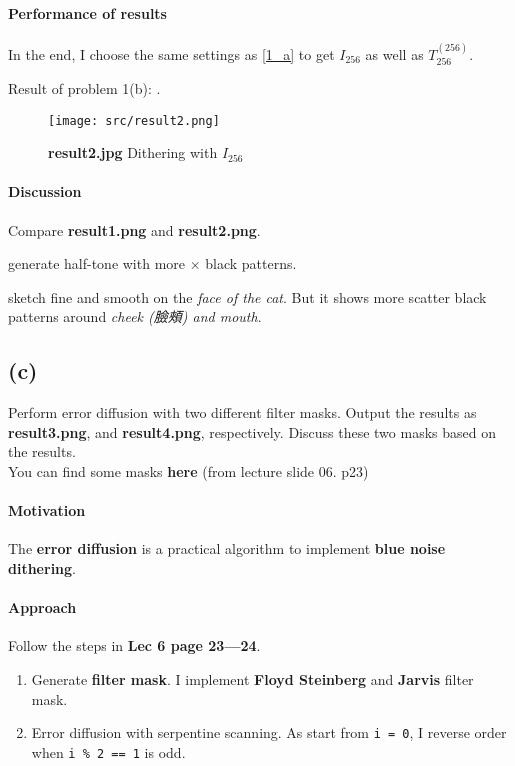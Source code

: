 \paragraph{Performance of results}
In the end, I choose the same settings as \ref{1_a} to get \(I_{256}\) as well as \(T^{(256)}_{256}\).

Result of problem 1(b): .
\begin{figure}
    \centering
    \texttt{[image: src/result2.png]}
    \caption{\textbf{result2.jpg} Dithering with \(I_{256}\)}
    \label{result2}
\end{figure}

\paragraph{Discussion}
Compare \textbf{result1.png} and \textbf{result2.png}.

 generate half-tone with more \(\times\) black patterns.

 sketch fine and smooth on the \textit{face of the cat}. But it shows more scatter black patterns around \textit{cheek (臉頰) and mouth}.

\subsection{(c)}\label{1_c}
Perform error diffusion with two different filter masks. Output the results as \textbf{result3.png}, and \textbf{result4.png}, respectively. Discuss these two masks based on the results. \\
You can find some masks \textbf{here} (from lecture slide 06. p23)

\paragraph{Motivation}
The \textbf{error diffusion} is a practical algorithm to implement \textbf{blue noise dithering}.

\paragraph{Approach}
Follow the steps in \textbf{Lec 6 page 23---24}.
\begin{enumerate}
    \item Generate \textbf{filter mask}. I implement \textbf{Floyd Steinberg} and \textbf{Jarvis} filter mask.
    \item Error diffusion with serpentine scanning. As start from \texttt{i = 0}, I reverse order when \texttt{i \% 2 == 1} is odd.
\end{enumerate}

